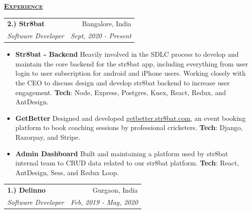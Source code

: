 \documentclass[11pt, a4paper]{article}
\begin{document}
\setlength\tabcolsep{0pt}
\begin{flushleft}
    \uline{\textsc{\large{\textbf{Experience}}}\hfill}
    \newline
    \newline
\setlength\tabcolsep{0pt}
\begin{tabularx}{\textwidth}{X r}
    \large{\textbf{2.) Str8bat}} & Bangalore, India\\
    \textit{Software Developer} & \textit {Sept, 2020 - Present}\\
\end{tabularx}
\begin{itemize}
    \textbf{Str8bat uses IoT based technology that gives real-time actionable insights to budding and professional cricket batters.
    }

    \textbf{Responsible}
    for the whole backend development, related integration with other platforms like SendGrid, MSG91, google, and apple for subscription-related things, mentoring juniors, interns, and everything else that comes with working in a small team startup.

    \item {\bf{Str8bat - Backend}}
    \newline
    Heavily involved in the SDLC process to develop and maintain the core backend for the str8bat app, including everything from user login to user subscription for android and iPhone users.
    Working closely with the CEO to discuss design and develop str8bat backend to increase user engagement.
    \newline
    \textbf{Tech}: Node, Express, Postgres, Knex, React, Redux, and AntDesign.
    \item {\bf{GetBetter}}
    \newline
    Designed and developed \href{https://getbetter.str8bat.com}{getbetter.str8bat.com}, an event booking platform to book coaching sessions by professional cricketers.
    \newline
    \textbf{Tech}: Django, Razorpay, and Stripe.
    \item {\bf{Admin Dashboard}}
    \newline
    Built and maintaining a platform used by str8bat internal team to CRUD data related to our str8bat platform.
    \newline
    \textbf{Tech}: React, AntDesign, Sess, and Redux Loop. 

\end{itemize}

    \begin{tabularx}{\textwidth}{X r}
        \large{\textbf{1.) Delinno}} & Gurgaon, India\\
        \textit{Software Developer}  & \textit {Feb, 2019 - May, 2020}\\
    \end{tabularx}
\end{flushleft}
\end{document}
